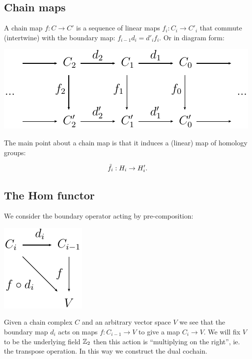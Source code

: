 \subsection{Chain maps}

A chain map $f:C\to C'$ is a sequence of linear maps
$f_i:C_i\to C'_i$ that commute (intertwine) with the boundary map:
$f_{i-1}d_i = d'_if_i.$
Or in diagram form:

\begin{center}
\includegraphics{chainmap.pdf}
\end{center}

The main point about
a chain map is that it
induces a (linear) map of homology groups:

    $$\tilde{f}_i : H_i\to H'_i.$$



\subsection{The Hom functor}


We consider the boundary operator acting
by pre-composition:

\begin{center}
\includegraphics{compose.pdf}
\end{center}

Given a chain complex $C$ and an arbitrary vector
space $V$ we see that the boundary
map $d_i$ acts on maps $f:C_{i-1}\to V$ to give a map $C_i\to V.$
We will fix $V$ to be the underlying field $\mathbb{Z}_2$ then
this action is ``multiplying on the right'',
ie. the transpose operation.
In this way we construct the dual cochain.


